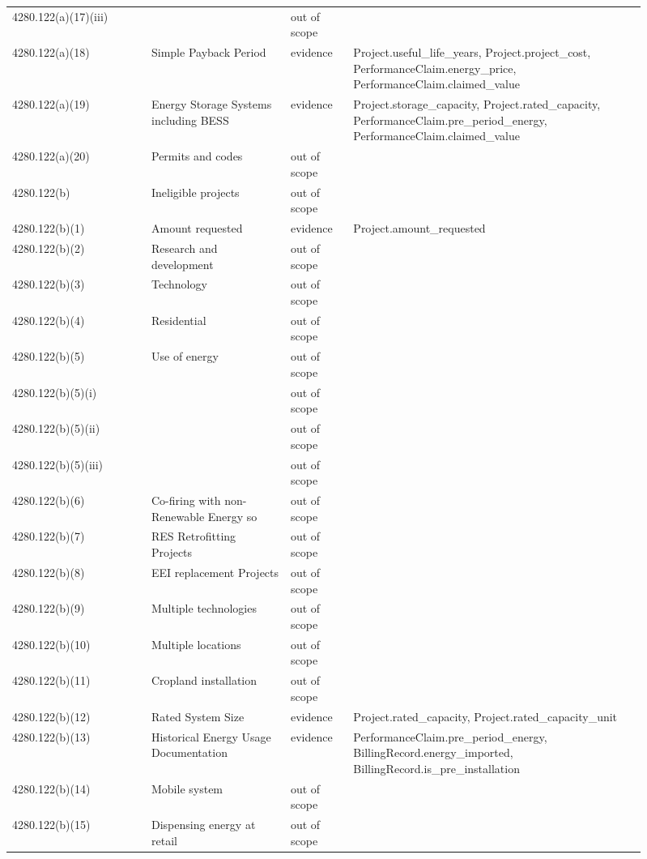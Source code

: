 \begin{longtable}{p{0.2\linewidth}p{0.2\linewidth}p{0.09\linewidth}p{0.42\linewidth}}
4280.122(a)(17)(iii) &  & out of scope &  \\
4280.122(a)(18) & Simple Payback Period & evidence & Project.useful\_life\_years, Project.project\_cost, PerformanceClaim.energy\_price, PerformanceClaim.claimed\_value \\
4280.122(a)(19) & Energy Storage Systems including BESS & evidence & Project.storage\_capacity, Project.rated\_capacity, PerformanceClaim.pre\_period\_energy, PerformanceClaim.claimed\_value \\
4280.122(a)(20) & Permits and codes & out of scope &  \\
4280.122(b) & Ineligible projects & out of scope &  \\
4280.122(b)(1) & Amount requested & evidence & Project.amount\_requested \\
4280.122(b)(2) & Research and development & out of scope &  \\
4280.122(b)(3) & Technology & out of scope &  \\
4280.122(b)(4) & Residential & out of scope &  \\
4280.122(b)(5) & Use of energy & out of scope &  \\
4280.122(b)(5)(i) &  & out of scope &  \\
4280.122(b)(5)(ii) &  & out of scope &  \\
4280.122(b)(5)(iii) &  & out of scope &  \\
4280.122(b)(6) & Co-firing with non-Renewable Energy so & out of scope &  \\
4280.122(b)(7) & RES Retrofitting Projects & out of scope &  \\
4280.122(b)(8) & EEI replacement Projects & out of scope &  \\
4280.122(b)(9) & Multiple technologies & out of scope &  \\
4280.122(b)(10) & Multiple locations & out of scope &  \\
4280.122(b)(11) & Cropland installation & out of scope &  \\
4280.122(b)(12) & Rated System Size & evidence & Project.rated\_capacity, Project.rated\_capacity\_unit \\
4280.122(b)(13) & Historical Energy Usage Documentation & evidence & PerformanceClaim.pre\_period\_energy, BillingRecord.energy\_imported, BillingRecord.is\_pre\_installation \\
4280.122(b)(14) & Mobile system & out of scope &  \\
4280.122(b)(15) & Dispensing energy at retail & out of scope &  \\

\end{longtable}
